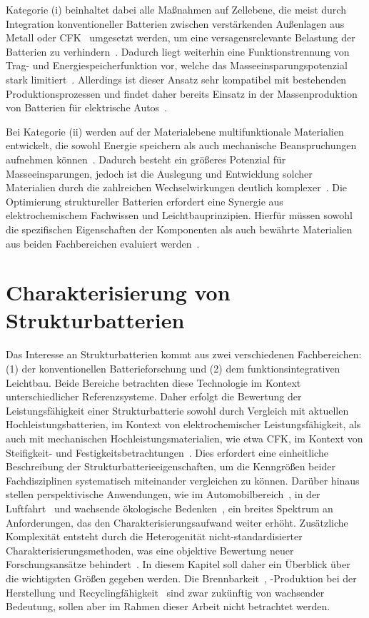 Kategorie (i) beinhaltet dabei alle Maßnahmen auf Zellebene, die meist durch Integration konventioneller Batterien zwischen verstärkenden Außenlagen aus Metall oder CFK~\cite{Galos2020,Attar2020} umgesetzt werden, um eine versagensrelevante Belastung der Batterien zu verhindern~\cite{Beard2019}. Dadurch liegt weiterhin eine Funktionstrennung von Trag- und Energiespeicherfunktion vor, welche das Masseeinsparungspotenzial stark limitiert~\cite{Jin2023}. Allerdings ist dieser Ansatz sehr kompatibel mit bestehenden Produktionsprozessen und findet daher bereits Einsatz in der Massenproduktion von Batterien für elektrische Autos~\cite{Tesla2020}.

Bei Kategorie (ii) werden auf der Materialebene multifunktionale Materialien entwickelt, die sowohl Energie speichern als auch mechanische Beanspruchungen aufnehmen können~\cite{Asp2014}. Dadurch besteht ein größeres Potenzial für Masseeinsparungen, jedoch ist die Auslegung und Entwicklung solcher Materialien durch die zahlreichen Wechselwirkungen deutlich komplexer~\cite{Jin2023,Carlstedt2018}.
Die Optimierung struktureller Batterien erfordert eine Synergie aus elektrochemischem Fachwissen und Leichtbauprinzipien. Hierfür müssen sowohl die spezifischen Eigenschaften der Komponenten als auch bewährte Materialien aus beiden Fachbereichen evaluiert werden~\cite{Asp2019}.

\section{\label{sec:Ermittlungsverfahren}Charakterisierung von Strukturbatterien}

Das Interesse an Strukturbatterien kommt aus zwei verschiedenen Fachbereichen: (1) der konventionellen Batterieforschung und (2) dem funktionsintegrativen Leichtbau. Beide Bereiche betrachten diese Technologie im Kontext unterschiedlicher Referenzsysteme. Daher erfolgt die Bewertung der Leistungsfähigkeit einer Strukturbatterie sowohl durch Vergleich mit aktuellen Hochleistungsbatterien, im Kontext von elektrochemischer Leistungsfähigkeit, als auch mit mechanischen Hochleistungsmaterialien, wie etwa CFK, im Kontext von Steifigkeit- und Festigkeitsbetrachtungen~\cite{O_Brien2011,Snyder2015}. Dies erfordert eine einheitliche Beschreibung der Strukturbatterieeigenschaften, um die Kenngrößen beider Fachdisziplinen systematisch miteinander vergleichen zu können. Darüber hinaus stellen perspektivische Anwendungen, wie im Automobilbereich~\cite{Martins2021,Pistoia2010}, in der Luftfahrt~\cite{Ishfaq2022} und wachsende ökologische Bedenken~\cite{EU2023}, ein breites Spektrum an Anforderungen, das den Charakterisierungsaufwand weiter erhöht. 
Zusätzliche Komplexität entsteht durch die Heterogenität nicht-standardisierter Charakterisierungsmethoden, was eine objektive Bewertung neuer Forschungsansätze behindert~\cite{Greenhalgh2023,Zschiebsch2024}. In diesem Kapitel soll daher ein Überblick über die wichtigsten Größen gegeben werden.
Die Brennbarkeit~\cite{Shirshova2021,Shirshova2024}, -Produktion bei der Herstellung und Recyclingfähigkeit~\cite{Heyadati2024} sind zwar zukünftig von wachsender Bedeutung, sollen aber im Rahmen dieser Arbeit nicht betrachtet werden.


